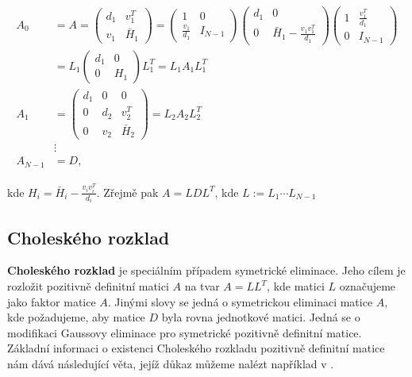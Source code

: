 \documentclass[11pt,american,czech,oneside]{book}
\theoremstyle{plain}
\theoremstyle{definition}
\begin{document}
\begin{gather}
\begin{aligned}
\label{SymEl}
A_0 & = A = \left( \begin{matrix}
               d_1 & v_1^T \\
               v_1 & \bar{H}_1
             \end{matrix} \right)
           =\left(\begin{matrix}
              1               & 0 \\
              \frac{v_1}{d_1} & I_{N-1}
            \end{matrix} \right)
            \left(\begin{matrix}
              d_1 & 0 \\
              0   & \bar{H}_1-\frac{v_1v_1^T}{d_1}
            \end{matrix} \right)
            \left(\begin{matrix}
              1 & \frac{v_1^T}{d_1} \\
              0 & I_{N-1}
            \end{matrix} \right) \\
    &     = L_1
            \left(\begin{matrix}
              d_1 & 0 \\
              0 & H_1
            \end{matrix} \right)
            L_1^T
          = L_1 A_1 L_1^T \\
  A_1 & = \left( \begin{matrix}
               d_1 &  0   & 0 \\
               0   &  d_2 & v_2^T \\
               0   &  v_2 & \bar{H}_2
             \end{matrix} \right)
        =  L_2 A_2 L_2^T \\
    & \vdots \\
  A_{N-1} & = D,
\end{aligned}
\end{gather}

kde $H_i=\bar{H}_i-\frac{v_i v_i^T}{d_i}$.
Zřejmě pak $A = LDL^T$, kde $L:=L_1\cdots L_{N-1}$

\subsection{Choleského rozklad}
\label{Cholesky}
\textbf{Choleského rozklad} je speciálním případem symetrické eliminace. Jeho cílem je rozložit pozitivně definitní matici $A$ na tvar $A=LL^T$, kde matici $L$ označujeme jako faktor matice $A$. Jinými slovy se jedná o symetrickou eliminaci matice $A$, kde požadujeme, aby matice $D$ byla rovna jednotkové matici. Jedná se o modifikaci Gaussovy eliminace pro symetrické pozitivně definitní matice. Základní informaci o existenci Choleského rozkladu pozitivně definitní matice nám dává následující věta, jejíž důkaz můžeme nalézt například v \cite{govl:83}.
\end{document}
